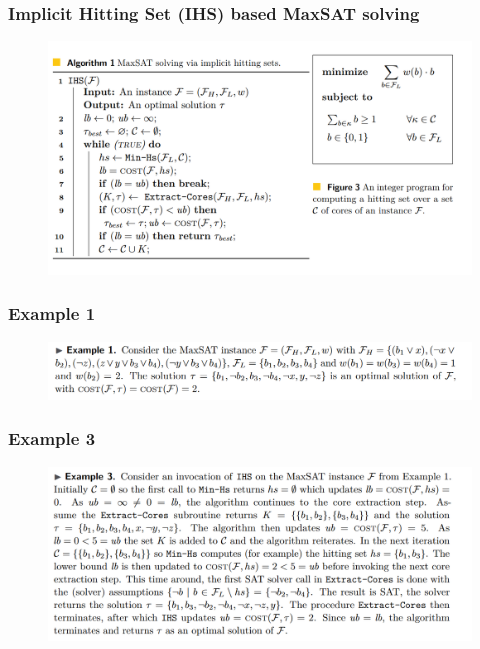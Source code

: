 \documentclass[aspectratio=169 %
,serif,mathserif]{beamer}
\begin{document}
\begin{frame}
	\frametitle{Implicit Hitting Set (IHS) based MaxSAT solving}
	\begin{figure}[htbp]
		\includegraphics[width=0.7\linewidth]{6.png}
	\end{figure}
\end{frame}

\begin{frame}
	\frametitle{Example 1}
	\begin{figure}[htbp]
		\includegraphics[width=1\linewidth]{1.png}
	\end{figure}
\end{frame}

\begin{frame}
	\frametitle{Example 3}
	\begin{figure}[htbp]
		\includegraphics[width=0.8\linewidth]{7.png}
	\end{figure}
\end{frame}
\end{document}
